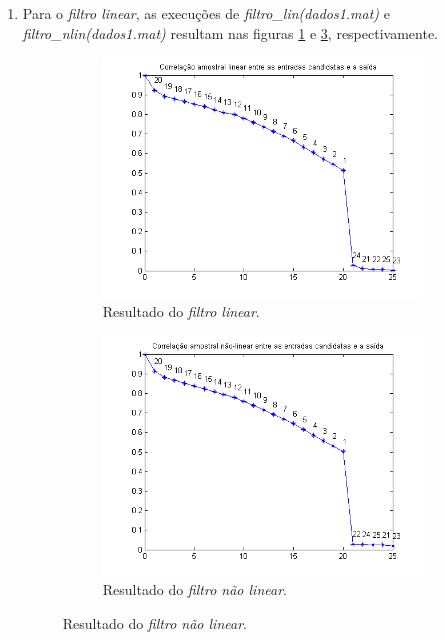 \begin{enumerate}
\begin{enumerate}
			    
			    \item Para o \textit{filtro linear}, as execuções de 
			    \textit{filtro\_lin(dados1.mat)} e \textit{filtro\_nlin(dados1.mat)}
			    resultam nas figuras \ref{fig:filtro_lin} e \ref{fig:filtro_nlin},
			    respectivamente.
			    
			    \FloatBarrier
			    
				\begin{figure}[h!]
				
				\centering
				
					\begin{subfigure}{.5\textwidth}
					  \centering
					  \includegraphics[width=1\linewidth]{image/filtro_lin}
					  \caption{Resultado do \textit{filtro linear}.}
					  \label{fig:filtro_lin}
					\end{subfigure}%
					\begin{subfigure}{.5\textwidth}
					  \centering
					  \includegraphics[width=1\linewidth]{image/filtro_nlin}
					  \caption{Resultado do \textit{filtro não linear}.}
					  \label{fig:filtro_nlin}
				\end{subfigure}
				

\end{figure}
\end{enumerate}
\end{enumerate}
